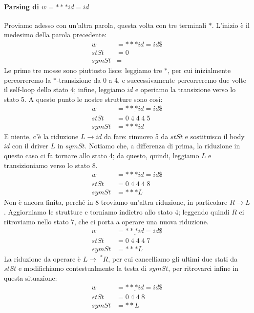 \documentclass[class=book, crop=false, oneside, 12pt]{standalone}
\begin{document}
\paragraph{Parsing di \(w = ***id\!=\!id\)}
Proviamo adesso con un'altra parola, questa volta con tre terminali \(\ast\). L'inizio è il medesimo della parola precedente:
\begin{align*}
    w &= ***id\!=\!id\$ \\
    stSt &= 0 \\
    symSt &=  
\end{align*}
Le prime tre mosse sono piuttosto lisce: leggiamo tre \(\ast\), per cui inizialmente percorreremo la \(\ast\)-transizione da 0 a 4, e successivamente percorreremo due volte il self-loop dello stato 4; infine, leggiamo \(id\) e operiamo la transizione verso lo stato 5. A questo punto le nostre strutture sono così:
\begin{align*}
    w &= \underline{***id}\!=id\$ \\
    stSt &= 0\;4\;4\;4\;5 \\
    symSt &= ***id 
\end{align*}
E niente, c'è la riduzione \(L \to id\) da fare: rimuovo 5 da \(stSt\) e sostituisco il body \(id\) con il driver \(L\) in \(symSt\). Notiamo che, a differenza di prima, la riduzione in questo caso ci fa tornare allo stato 4; da questo, quindi, leggiamo \(L\) e transizioniamo verso lo stato 8.
\begin{align*}
    w &= \underline{***id}\!=id\$ \\
    stSt &= 0\;4\;4\;4\;8 \\
    symSt &= ***L 
\end{align*}
Non è ancora finita, perché in 8 troviamo un'altra riduzione, in particolare \(R \to L\). Aggiorniamo le strutture e torniamo indietro allo stato 4; leggendo quindi \(R\) ci ritroviamo nello stato 7, che ci porta a operare una nuova riduzione.
\begin{align*}
    w &= \underline{***id}\!=id\$ \\
    stSt &= 0\;4\;4\;4\;7 \\
    symSt &= ***L 
\end{align*}
La riduzione da operare è \(L \rightarrow\; ^{*}R\), per cui cancelliamo gli ultimi due stati da \(stSt\) e modifichiamo contestualmente la testa di \(symSt\), per ritrovarci infine in questa situazione:
\begin{align*}
    w &= \underline{***id}\!=id\$ \\
    stSt &= 0\;4\;4\;8 \\
    symSt &= **L 
\end{align*}
\end{document}
